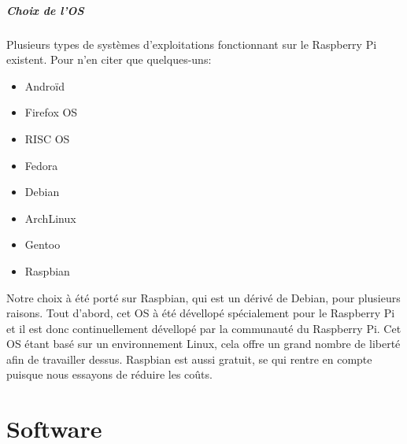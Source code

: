 \documentclass[a4paper,12pt]{article}
\begin{document}
{\subsubsection{Choix de l'OS}
Plusieurs types de systèmes d'exploitations fonctionnant sur le Raspberry Pi existent. Pour n'en citer que quelques-uns:
\begin{multicols}{2}
\begin{itemize}
\item Androïd
\item Firefox OS
\item RISC OS
\item Fedora
\item Debian
\item ArchLinux
\item Gentoo
\item Raspbian
\end{itemize}
\end{multicols}
Notre choix à été porté sur Raspbian, qui est un dérivé de Debian, pour plusieurs raisons. Tout d'abord, cet OS à été dévellopé spécialement pour le Raspberry Pi et il est donc continuellement dévellopé par la communauté du Raspberry Pi. Cet OS étant basé sur un environnement Linux, cela offre un grand nombre de liberté afin de travailler dessus. Raspbian est aussi gratuit, se qui rentre en compte puisque nous essayons de réduire les coûts.  


\part{Software}






}
\end{document}
